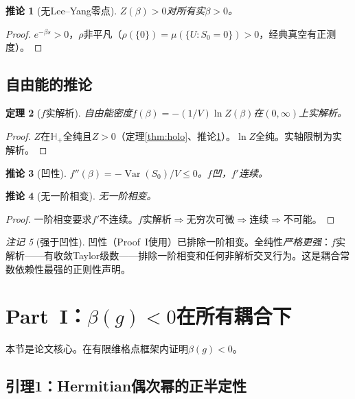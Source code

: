 \documentclass[12pt,a4paper]{article}
\theoremstyle{plain}
\newtheorem{theorem}{定理}[section]
\newtheorem{corollary}[theorem]{推论}
\theoremstyle{definition}
\theoremstyle{remark}
\newtheorem{remark}[theorem]{注记}
\begin{document}
\begin{corollary}[无Lee--Yang零点]\label{cor:LY}
$Z(\beta)>0$对所有实$\beta>0$。
\end{corollary}

\begin{proof}
$e^{-\beta s}>0$，$\rho$非平凡（$\rho(\{0\})=\mu(\{U:S_0=0\})>0$，经典真空有正测度）。
\end{proof}

\subsection{自由能的推论}\label{sec:free}

\begin{theorem}[$f$实解析]\label{thm:fanalytic}
自由能密度$f(\beta)=-(1/V)\ln Z(\beta)$在$(0,\infty)$上实解析。
\end{theorem}

\begin{proof}
$Z$在$\mathbb{H}_+$全纯且$Z>0$（定理\ref{thm:holo}、推论\ref{cor:LY}）。$\ln Z$全纯。实轴限制为实解析。
\end{proof}

\begin{corollary}[凹性]\label{cor:concave}
$f''(\beta)=-\operatorname{Var}(S_0)/V\leq 0$。$f$凹，$f'$连续。
\end{corollary}

\begin{corollary}[无一阶相变]\label{cor:no1st}
无一阶相变。
\end{corollary}

\begin{proof}
一阶相变要求$f'$不连续。$f$实解析$\Rightarrow$无穷次可微$\Rightarrow$连续$\Rightarrow$不可能。
\end{proof}

\begin{remark}[强于凹性]\label{rem:stronger}
凹性（Proof~I使用）已排除一阶相变。全纯性\emph{严格更强}：$f$实解析——有收敛Taylor级数——排除一阶相变和任何非解析交叉行为。这是耦合常数依赖性最强的正则性声明。
\end{remark}
\section{Part~I：$\beta(g)<0$在所有耦合下}\label{sec:betaneg}

本节是论文核心。在有限维格点框架内证明$\beta(g)<0$。

\subsection{引理1：Hermitian偶次幂的正半定性}\label{sec:lemma1}
\end{document}
